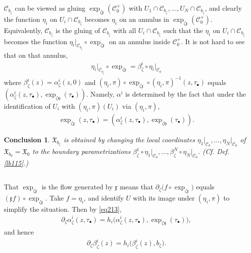 \documentclass[12pt,a4paper,notitlepage]{article}
\theoremstyle{definition}
\theoremstyle{plain}
\newtheorem{ccl}[df]{Conclusion}
\newcommand{\fk}{\mathfrak}
\newcommand{\mc}{\mathcal}
\newcommand{\xk}{\mathfrak x}
\newcommand{\yk}{\mathfrak y}
\newcommand{\blt}{\bullet}
\numberwithin{equation}{section}
\begin{document}

$\mc C_{b_\zeta}$ can be viewed as gluing $\exp_{\zeta\xk}(\mc C_0^+)$ with $U_1\cap \mc C_{b_\zeta},\dots,U_N\cap\mc C_{b_\zeta}$, and clearly the function $\eta_i$ on $U_i\cap\mc C_{b_\zeta}$ becomes $\eta_i$ on an annulus in $\exp_{\zeta\xk}(\mc C_0^+)$. Equivalently, $\mc C_{b_\zeta}$ is the gluing of $\mc C_{b_\zeta}$ with all $U_i\cap\mc C_{b_\zeta}$ such that the $\eta_i$ on $U_i\cap\mc C_{b_\zeta}$ becomes the function $\eta_i\big|_{\mc C_{b_\zeta}}\circ\exp_{\zeta\xk}$ on an annulus inside $\mc C_0^+$. It is not hard to see that on that annulus,
\begin{align}
\eta_i\big|_{\mc C_{b_\zeta}}\circ\exp_{\zeta\xk}=\beta^i_\zeta\circ\eta_i\big|_{\mc C_0}
\end{align}
where $\beta^i_\zeta(z)=\alpha^i_\zeta(z,0)$ and $(\eta_i,\pi)\circ\exp_{\zeta\xk}\circ (\eta_i,\pi)^{-1}(z,\tau_\blt)$ equals $(\alpha^i_\zeta(z,\tau_\blt),\exp_{\zeta\yk}(\tau_\blt))$. Namely, $\alpha^i$ is determined by the fact that under the identification of $U_i$ with $(\eta_i,\pi)(U_i)$ via $(\eta_i,\pi)$, 
\begin{align}
\exp_{\zeta\xk}(z,\tau_\blt)=(\alpha^i_\zeta(z,\tau_\blt),\exp_{\zeta\yk}(\tau_\blt)).\label{eq236}
\end{align}





\begin{ccl}
$\fk X_{b_\zeta}$ is obtained by changing the local coordinates $\eta_1\big|_{\mc C_0},\dots,\eta_N\big|_{\mc C_0}$ of $\fk X_{b_0}=\fk X_0$ to the boundary parametrizations $\beta^1_\zeta\circ\eta_1\big|_{\mc C_0},\dots,\beta^N_\zeta\circ\eta_N\big|_{\mc C_0}$. (Cf. Def. \ref{lb115}.)
\end{ccl}



\subsection{}\label{lb117}

That $\exp_{\zeta\xk}$ is the flow generated by $\xk$ means that $\partial_\zeta \big(f\circ\exp_{\zeta\xk}\big)$ equals  $(\xk f)\circ\exp_{\zeta\xk}$. Take $f=\eta_i$, and identify $U$ with its image under $(\eta_i,\pi)$ to simplify the situation. Then by \eqref{eq213},
\begin{align}
\partial_\zeta\alpha^i_\zeta(z,\tau_\blt)=h_i\big(\alpha^i_\zeta(z,\tau_\blt),\exp_{\zeta\yk}(\tau_\blt)\big),
\end{align}
and hence
\begin{align}
\partial_\zeta\beta^i_\zeta(z)=h_i\big(\beta^i_\zeta(z),b_\zeta\big).
\end{align}
\end{document}
